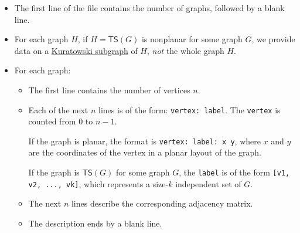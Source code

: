 \documentclass[a4paper]{article}
\theoremstyle{definition}
\theoremstyle{remark}
\numberwithin{equation}{section}
\begin{document}
\begin{itemize}
	\item The first line of the file contains the number of graphs, followed by a blank line.
	
	\item For each graph $H$, if $H = \mathsf{TS}(G)$ is nonplanar for some graph $G$, we provide data on a \href{https://en.wikipedia.org/wiki/Kuratowski\%27s_theorem}{Kuratowski subgraph} of $H$, \textit{not} the whole graph $H$.
	
	\item For each graph:
	\begin{itemize}
		\item The first line contains the number of vertices $n$.
		
		\item Each of the next $n$ lines is of the form: \verb+vertex: label+. 
		The \verb+vertex+ is counted from $0$ to $n-1$.
		
		If the graph is planar, the format is \verb+vertex: label: x y+, where $x$ and $y$ are the coordinates of the vertex in a planar layout of the graph.
		
		If the graph is $\mathsf{TS}(G)$ for some graph $G$, the \verb+label+ is of the form \verb+[v1, v2, ..., vk]+, which represents a size-$k$ independent set of $G$.
		
		\item The next $n$ lines describe the corresponding adjacency matrix.
		
		\item The description ends by a blank line.
	\end{itemize}
\end{itemize}
\end{document}
